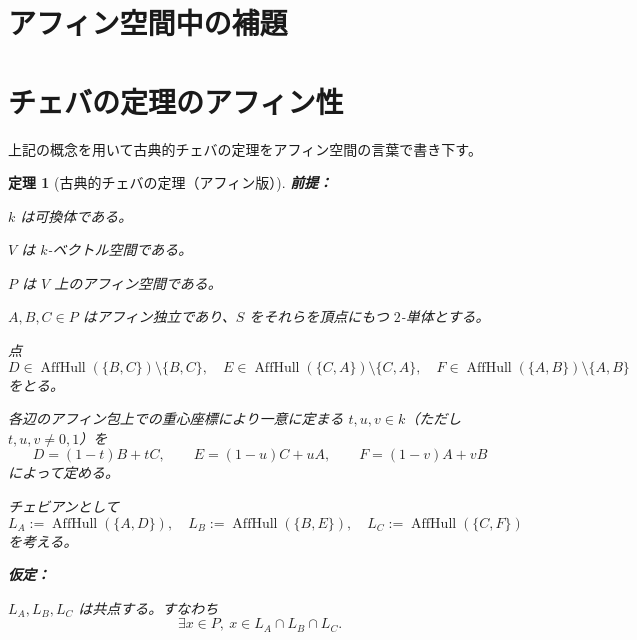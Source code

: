 \documentclass[a4paper,12pt]{bxjsbook}
\newlength{\customindent}
\newenvironment{body}{
  \par
  \begingroup
  \setlength{\leftskip}{\customindent}
  \setlength{\rightskip}{0pt}
  \setlength{\parindent}{1em}
  \setlength{\displayindent}{\customindent}
  \setlength{\displaywidth}{\dimexpr\linewidth-\customindent\relax}
}{
  \par
  \endgroup
}
\theoremstyle{theorem}
\newtheorem{theorem}{定理}[chapter]
\DeclareMathOperator{\AffHull}{AffHull}
\begin{document}
    \section{アフィン空間中の補題}

    \section{チェバの定理のアフィン性}

    \begin{body}
        \indent 上記の概念を用いて古典的チェバの定理をアフィン空間の言葉で書き下す。
    \end{body}

    \begin{theorem}[古典的チェバの定理（アフィン版）]

        \noindent\textbf{前提：}\par
        \begin{theoremenumerate}[label=(P\arabic*), leftmargin=4em, topsep=2pt, partopsep=0pt, itemsep=0pt, parsep=0pt]
          \item $k$ は可換体である。
          \item $V$ は $k$-ベクトル空間である。
          \item $P$ は $V$ 上のアフィン空間である。
          \item $A,B,C\in P$ はアフィン独立であり、$S$ をそれらを頂点にもつ $2$-単体とする。
          \item 点
          \[
            D\in \AffHull(\{B,C\})\setminus\{B,C\},\quad
            E\in \AffHull(\{C,A\})\setminus\{C,A\},\quad
            F\in \AffHull(\{A,B\})\setminus\{A,B\}
          \]
          をとる。
          \item 各辺のアフィン包上での重心座標により一意に定まる $t,u,v\in k$（ただし $t,u,v\neq 0,1$）を
          \[
            D=(1-t)B+tC,\qquad
            E=(1-u)C+uA,\qquad
            F=(1-v)A+vB
          \]
          によって定める。
          \item チェビアンとして
          \[
            L_A:=\AffHull(\{A,D\}),\quad
            L_B:=\AffHull(\{B,E\}),\quad
            L_C:=\AffHull(\{C,F\})
          \]
          を考える。
        \end{theoremenumerate}
        
        \noindent\textbf{仮定：}\par
        \begin{theoremenumerate}[label=(A\arabic*), leftmargin=4em, topsep=2pt, partopsep=0pt, itemsep=0pt, parsep=0pt]
          \item $L_A,L_B,L_C$ は共点する。すなわち
          \[
            \exists x\in P,\ x\in L_A\cap L_B\cap L_C.
          \]
        \end{theoremenumerate}
        

\end{theorem}
\end{document}
